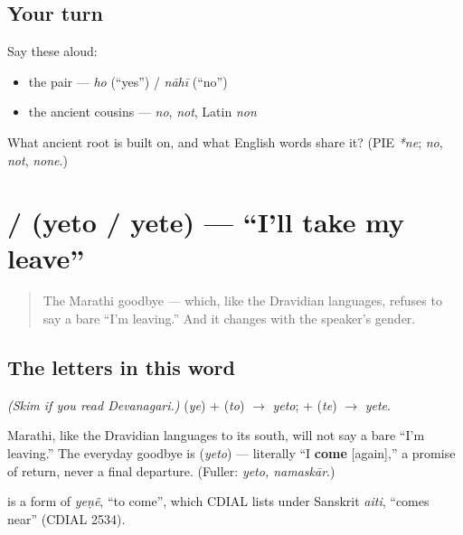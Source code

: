 \subsection*{Your turn}
Say these aloud:

\begin{itemize}
\raggedright
  \item the pair — \emph{ho} (\textquotedblleft{}yes\textquotedblright{}) / \emph{nāhī} (\textquotedblleft{}no\textquotedblright{})
  \item the ancient cousins — \emph{no}, \emph{not}, Latin \emph{non}
\end{itemize}

\begin{tcolorbox}[breakable,colback=teal!4,colframe=teal!35!black,title={Before you move on}]
What ancient root is \textbf{} built on, and what English words share it? (PIE \emph{*ne}; \emph{no}, \emph{not}, \emph{none}.)
\end{tcolorbox}
\section[\texorpdfstring{\mr{येतो} / \mr{येते} (yeto / yete)}{येतो / येते (yeto / yete)}]{ /  (yeto / yete) — \textquotedblleft{}I'll take my leave\textquotedblright{}}

\label{lesson:MR-C01-yeto}



\begin{quote}
The Marathi goodbye — which, like the Dravidian languages, refuses to say a bare \textquotedblleft{}I'm leaving.\textquotedblright{} And it changes with the speaker's gender.
\end{quote}

\subsection*{The letters in this word}
\emph{(Skim if you read Devanagari.)} \textbf{} (\emph{ye}) + \textbf{} (\emph{to}) $\to$ \emph{yeto}; \textbf{} + \textbf{} (\emph{te}) $\to$ \emph{yete}.

\begin{cousinweb}
Marathi, like the Dravidian languages to its south, will not say a bare \textquotedblleft{}I'm leaving.\textquotedblright{} The everyday goodbye is \textbf{} (\emph{yeto}) — literally \textquotedblleft{}I \textbf{come} {[}again{]},\textquotedblright{} a promise of return, never a final departure. (Fuller: \emph{yeto, namaskār}.)

\textbf{} is a form of \emph{yeṇẽ}, \textquotedblleft{}to come\textquotedblright{}, which CDIAL lists under Sanskrit \emph{aiti}, \textquotedblleft{}comes near\textquotedblright{} (CDIAL 2534).
\end{cousinweb}

